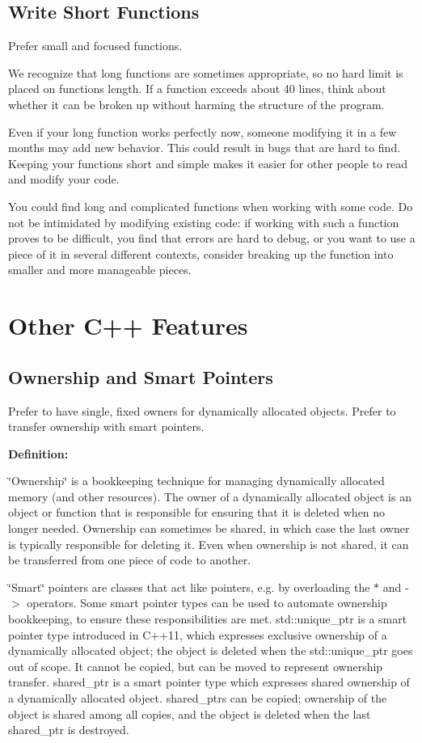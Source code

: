 \subsection*{Write Short Functions}

Prefer small and focused functions.

We recognize that long functions are sometimes appropriate, so no hard limit is placed on functions length. If a function exceeds about 40 lines, think about whether it can be broken up without harming the structure of the program.

Even if your long function works perfectly now, someone modifying it in a few months may add new behavior. This could result in bugs that are hard to find. Keeping your functions short and simple makes it easier for other people to read and modify your code.

You could find long and complicated functions when working with some code. Do not be intimidated by modifying existing code\+: if working with such a function proves to be difficult, you find that errors are hard to debug, or you want to use a piece of it in several different contexts, consider breaking up the function into smaller and more manageable pieces.

\section*{Other C++ Features}

\subsection*{Ownership and Smart Pointers}

Prefer to have single, fixed owners for dynamically allocated objects. Prefer to transfer ownership with smart pointers.

{\bfseries Definition\+:}

\char`\"{}\+Ownership\char`\"{} is a bookkeeping technique for managing dynamically allocated memory (and other resources). The owner of a dynamically allocated object is an object or function that is responsible for ensuring that it is deleted when no longer needed. Ownership can sometimes be shared, in which case the last owner is typically responsible for deleting it. Even when ownership is not shared, it can be transferred from one piece of code to another.

\char`\"{}\+Smart\char`\"{} pointers are classes that act like pointers, e.\+g. by overloading the $\ast$ and -\/$>$ operators. Some smart pointer types can be used to automate ownership bookkeeping, to ensure these responsibilities are met. {\ttfamily std\+::unique\+\_\+ptr} is a smart pointer type introduced in C++11, which expresses exclusive ownership of a dynamically allocated object; the object is deleted when the {\ttfamily std\+::unique\+\_\+ptr} goes out of scope. It cannot be copied, but can be moved to represent ownership transfer. shared\+\_\+ptr is a smart pointer type which expresses shared ownership of a dynamically allocated object. {\ttfamily shared\+\_\+ptrs} can be copied; ownership of the object is shared among all copies, and the object is deleted when the last {\ttfamily shared\+\_\+ptr} is destroyed.

